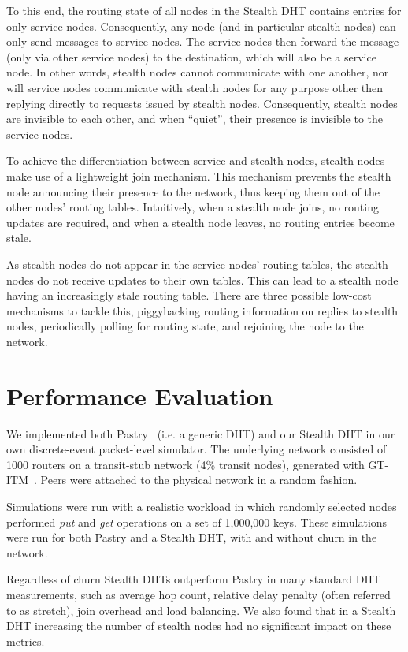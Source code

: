 \documentclass{sig-alt-release2}
\begin{document}
To this end, the routing state of all nodes in the Stealth DHT
contains entries for only service nodes. Consequently, any node (and
in particular stealth nodes) can only send messages to service
nodes. The service nodes then forward the message (only via other
service nodes) to the destination, which will also be a service
node. In other words, stealth nodes cannot communicate with one
another, nor will service nodes communicate with stealth nodes for
any purpose other then replying directly to requests issued by
stealth nodes. Consequently, stealth nodes are invisible to each
other, and when ``quiet'', their presence is invisible to the
service nodes.

To achieve the differentiation between service and stealth nodes,
stealth nodes make use of a lightweight join mechanism. This
mechanism prevents the stealth node announcing their presence to the
network, thus keeping them out of the other nodes' routing tables.
Intuitively, when a stealth node joins, no routing updates are
required, and when a stealth node leaves, no routing entries become
stale.

As stealth nodes do not appear in the service nodes' routing tables,
the stealth nodes do not receive updates to their own tables. This
can lead to a stealth node having an increasingly stale routing
table. There are three possible low-cost mechanisms to tackle this,
piggybacking routing information on replies to stealth nodes,
periodically polling for routing state, and rejoining the node to
the network.

\section{Performance Evaluation}
\label{sect:eval}

We implemented both Pastry~\cite{pastry01} (i.e. a generic DHT) and
our Stealth DHT in our own discrete-event packet-level simulator.
The underlying network consisted of 1000 routers on a transit-stub
network (4\% transit nodes), generated with GT-ITM~\cite{gtitm}.
Peers were attached to the physical network in a random fashion.

Simulations were run with a realistic workload in which randomly
selected nodes performed {\em put} and {\em get} operations on a set
of 1,000,000 keys. These simulations were run for both Pastry and a
Stealth DHT, with and without churn in the network.

Regardless of churn Stealth DHTs outperform Pastry in many standard
DHT measurements, such as average hop count, relative delay penalty
(often referred to as stretch), join overhead and load balancing. We
also found that in a Stealth DHT increasing the number of stealth
nodes had no significant impact on these metrics.
\end{document}
